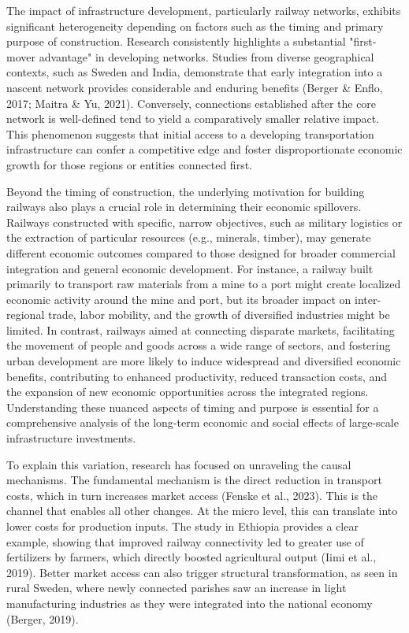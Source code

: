 \documentclass[12pt, a4paper]{article}
\begin{document}
The impact of infrastructure development, particularly railway networks, exhibits significant heterogeneity depending on factors such as the timing and primary purpose of construction. Research consistently highlights a substantial "first-mover advantage" in developing networks. Studies from diverse geographical contexts, such as Sweden and India, demonstrate that early integration into a nascent network provides considerable and enduring benefits (Berger \& Enflo, 2017; Maitra \& Yu, 2021). Conversely, connections established after the core network is well-defined tend to yield a comparatively smaller relative impact. This phenomenon suggests that initial access to a developing transportation infrastructure can confer a competitive edge and foster disproportionate economic growth for those regions or entities connected first.

Beyond the timing of construction, the underlying motivation for building railways also plays a crucial role in determining their economic spillovers. Railways constructed with specific, narrow objectives, such as military logistics or the extraction of particular resources (e.g., minerals, timber), may generate different economic outcomes compared to those designed for broader commercial integration and general economic development. For instance, a railway built primarily to transport raw materials from a mine to a port might create localized economic activity around the mine and port, but its broader impact on inter-regional trade, labor mobility, and the growth of diversified industries might be limited. In contrast, railways aimed at connecting disparate markets, facilitating the movement of people and goods across a wide range of sectors, and fostering urban development are more likely to induce widespread and diversified economic benefits, contributing to enhanced productivity, reduced transaction costs, and the expansion of new economic opportunities across the integrated regions. Understanding these nuanced aspects of timing and purpose is essential for a comprehensive analysis of the long-term economic and social effects of large-scale infrastructure investments.


To explain this variation, research has focused on unraveling the causal mechanisms. The fundamental mechanism is the direct reduction in transport costs, which in turn increases market access (Fenske et al., 2023). This is the channel that enables all other changes. At the micro level, this can translate into lower costs for production inputs. The study in Ethiopia provides a clear example, showing that improved railway connectivity led to greater use of fertilizers by farmers, which directly boosted agricultural output (Iimi et al., 2019). Better market access can also trigger structural transformation, as seen in rural Sweden, where newly connected parishes saw an increase in light manufacturing industries as they were integrated into the national economy (Berger, 2019).
\end{document}

